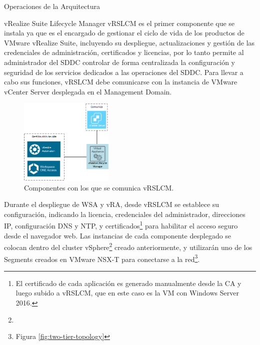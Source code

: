 \begin{subsection}{Operaciones de la Arquitectura}
    \begin{subsubsection}{vRealize Suite Lifecycle Manager}
        vRSLCM es el primer componente que se instala ya que es el encargado de gestionar el ciclo de vida de los productos de VMware vRealize Suite, incluyendo su despliegue, actualizaciones y gestión de las credenciales de administración, certificados y licencias, por lo tanto permite al administrador del SDDC controlar de forma centralizada la configuración y seguridad de los servicios dedicados a las operaciones del SDDC. Para llevar a cabo sus funciones, vRSLCM debe comunicarse con la instancia de VMware vCenter Server desplegada en el Management Domain.
        \begin{figure}[h]
            \centering
            \includegraphics[width=0.4\textwidth]{imaxes/pruebaconcepto/vrealize/diseno-vrlscm.png}
            \caption{Componentes con los que se comunica vRSLCM.}
            \label{fig:vrealize-components}
        \end{figure}
        \FloatBarrier        
        Durante el despliegue de WSA y vRA, desde vRSLCM se establece su configuración, indicando la licencia, credenciales del administrador, direcciones IP, configuración DNS y NTP, y certificados\footnote{El certificado de cada aplicación es generado manualmente desde la CA y luego subido a vRSLCM, que en este caso es la VM con Windows Server 2016.} para habilitar el acceso seguro desde el navegador web. Las instancias de cada componente desplegado se colocan dentro del cluster vSphere\footnote{} creado anteriormente, y utilizarán uno de los Segments creados en VMware NSX-T para conectarse a la red\footnote{Figura \ref{fig:two-tier-topology}}.
        

\end{subsubsection}
\end{subsection}
